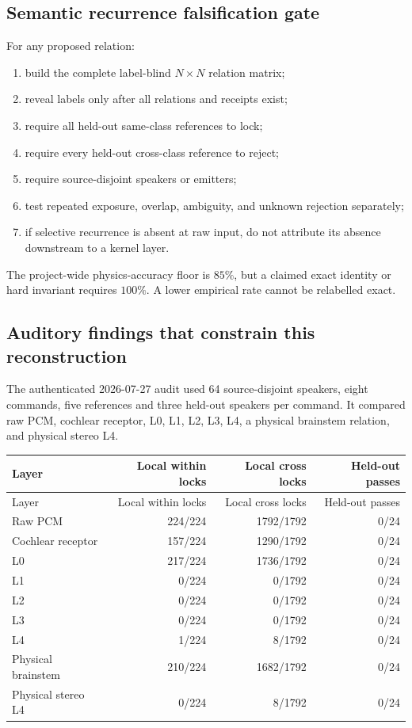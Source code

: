\documentclass[11pt,oneside]{article}
\begin{document}
\subsection{Semantic recurrence falsification gate}

For any proposed relation:
\begin{enumerate}
  \item build the complete label-blind \(N\times N\) relation matrix;
  \item reveal labels only after all relations and receipts exist;
  \item require all held-out same-class references to lock;
  \item require every held-out cross-class reference to reject;
  \item require source-disjoint speakers or emitters;
  \item test repeated exposure, overlap, ambiguity, and unknown rejection
  separately;
  \item if selective recurrence is absent at raw input, do not attribute its
  absence downstream to a kernel layer.
\end{enumerate}
The project-wide physics-accuracy floor is \(85\%\), but a claimed exact
identity or hard invariant requires \(100\%\). A lower empirical rate cannot
be relabelled exact.

\subsection{Auditory findings that constrain this reconstruction}

The authenticated 2026-07-27 audit used 64 source-disjoint speakers, eight
commands, five references and three held-out speakers per command. It compared
raw PCM, cochlear receptor, L0, L1, L2, L3, L4, a physical brainstem relation,
and physical stereo L4.

\begin{longtable}{lrrr}
\toprule
Layer & Local within locks & Local cross locks & Held-out passes\\
\midrule
\endfirsthead
\toprule
Layer & Local within locks & Local cross locks & Held-out passes\\
\midrule
\endhead
Raw PCM & 224/224 & 1792/1792 & 0/24\\
Cochlear receptor & 157/224 & 1290/1792 & 0/24\\
L0 & 217/224 & 1736/1792 & 0/24\\
L1 & 0/224 & 0/1792 & 0/24\\
L2 & 0/224 & 0/1792 & 0/24\\
L3 & 0/224 & 0/1792 & 0/24\\
L4 & 1/224 & 8/1792 & 0/24\\
Physical brainstem & 210/224 & 1682/1792 & 0/24\\
Physical stereo L4 & 0/224 & 8/1792 & 0/24\\
\bottomrule
\end{longtable}
\end{document}
